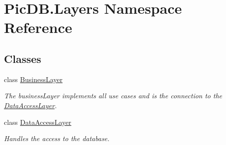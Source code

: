 \hypertarget{namespace_pic_d_b_1_1_layers}{}\section{Pic\+D\+B.\+Layers Namespace Reference}
\label{namespace_pic_d_b_1_1_layers}
\subsection*{Classes}
\begin{DoxyCompactItemize}
\item 
class \mbox{\hyperlink{class_pic_d_b_1_1_layers_1_1_business_layer}{Business\+Layer}}
\begin{DoxyCompactList}\small\item\em The business\+Layer implements all use cases and is the connection to the \mbox{\hyperlink{class_pic_d_b_1_1_layers_1_1_data_access_layer}{Data\+Access\+Layer}}. \end{DoxyCompactList}\item 
class \mbox{\hyperlink{class_pic_d_b_1_1_layers_1_1_data_access_layer}{Data\+Access\+Layer}}
\begin{DoxyCompactList}\small\item\em Handles the access to the database. \end{DoxyCompactList}\end{DoxyCompactItemize}
